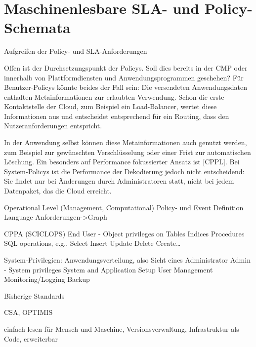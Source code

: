 \section{Maschinenlesbare SLA- und Policy-Schemata}

Aufgreifen der Policy- und SLA-Anforderungen

Offen ist der Durchsetzungspunkt der Policys. Soll dies bereits in der CMP oder innerhalb von Plattformdiensten und Anwendungsprogrammen geschehen? Für Benutzer-Policys könnte beides der Fall sein: Die versendeten Anwendungsdaten enthalten Metainformationen zur erlaubten Verwendung. Schon die erste Kontaktstelle der Cloud, zum Beispiel ein Load-Balancer, wertet diese Informationen aus und entscheidet entsprechend für ein Routing, dass den Nutzeranforderungen entspricht. 

In der Anwendung selbst können diese Metainformationen auch genutzt werden, zum Beispiel zur gewünschten Verschlüsselung oder einer Frist zur automatischen Löschung. Ein besonders auf Performance fokussierter Ansatz ist [CPPL]. Bei System-Policys ist die Performance der Dekodierung jedoch nicht entscheidend: Sie findet nur bei Änderungen durch Administratoren statt, nicht bei jedem Datenpaket, das die Cloud erreicht.

Operational Level (Management, Computational)
Policy- und Event Definition Language
Anforderungen->Graph



CPPA (SCICLOPS) End User - Object privileges on 
Tables 
Indices 
Procedures 
SQL operations, e.g.,  
Select 
Insert 
Update 
Delete 
Create… 

System-Privilegien: Anwendungsverteilung, also Sicht eines Administrator
Admin - System privileges 
System and Application Setup 
User Management
Monitoring/Logging
Backup

Bisherige Standards

CSA, OPTIMIS

einfach lesen für Mensch und Maschine, Versionsverwaltung, Infrastruktur als Code, erweiterbar


